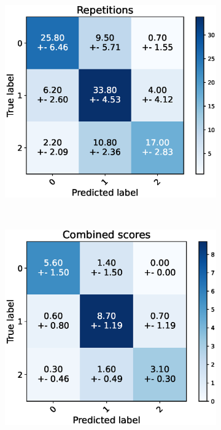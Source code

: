 \begin{figure}
  \centering
  \begin{subfigure}[t]{0.48\textwidth}
      \includegraphics[width=\textwidth]{files/figs/res/femval/cnf-reps.eps}
      \caption{}
      \label{fig:femval-cnf-reps}
  \end{subfigure}
  ~
  \begin{subfigure}[t]{0.48\textwidth}
      \includegraphics[width=\textwidth]{files/figs/res/femval/cnf-combined.eps}
      \caption{}
      \label{fig:femval-cnf-comb}
  \end{subfigure}


\end{figure}
